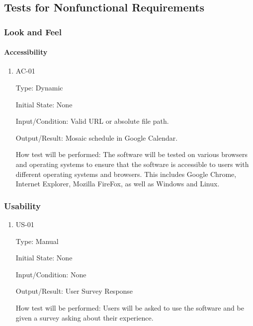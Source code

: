\documentclass[12pt, titlepage]{article}
\begin{document}
\subsection{Tests for Nonfunctional Requirements}

\subsubsection{Look and Feel}
		
\paragraph{Accessibility}

\begin{enumerate}

\item{AC-01\\}

Type: Dynamic
					
Initial State: None
					
Input/Condition: Valid URL or absolute file path.
					
Output/Result: Mosaic schedule in Google Calendar.
					
How test will be performed: The software will be tested on various browsers and operating systems to ensure that the software is accessible to users with different operating systems and browsers. This includes Google Chrome, Internet Explorer, Mozilla FireFox, as well as Windows and Linux.
	
\end{enumerate}

\subsubsection{Usability}

\begin{enumerate}

\item{US-01\\}

Type: Manual
					
Initial State: None
					
Input/Condition: None
					
Output/Result: User Survey Response
					
How test will be performed: Users will be asked to use the software and be given a survey asking about their experience. 

\end{enumerate}
\end{document}
